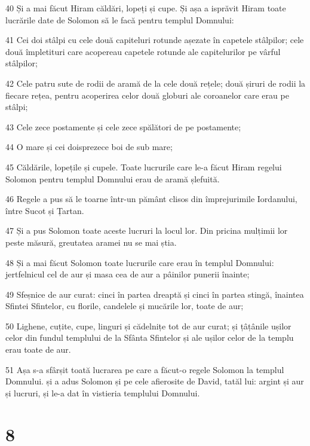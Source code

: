 \par 40 Și a mai făcut Hiram căldări, lopeți și cupe. Și așa a isprăvit Hiram toate lucrările date de Solomon să le facă pentru templul Domnului:
\par 41 Cei doi stâlpi cu cele două capiteluri rotunde așezate în capetele stâlpilor; cele două împletituri care acopereau capetele rotunde ale capitelurilor pe vârful stâlpilor;
\par 42 Cele patru sute de rodii de aramă de la cele două rețele; două șiruri de rodii la fiecare rețea, pentru acoperirea celor două globuri ale coroanelor care erau pe stâlpi;
\par 43 Cele zece postamente și cele zece spălători de pe postamente;
\par 44 O mare și cei doisprezece boi de sub mare;
\par 45 Căldările, lopețile și cupele. Toate lucrurile care le-a făcut Hiram regelui Solomon pentru templul Domnului erau de aramă șlefuită.
\par 46 Regele a pus să le toarne într-un pământ clisos din împrejurimile Iordanului, între Sucot și Țartan.
\par 47 Și a pus Solomon toate aceste lucruri la locul lor. Din pricina mulțimii lor peste măsură, greutatea aramei nu se mai știa.
\par 48 Și a mai făcut Solomon toate lucrurile care erau în templul Domnului: jertfelnicul cel de aur și masa cea de aur a pâinilor punerii înainte;
\par 49 Sfeșnice de aur curat: cinci în partea dreaptă și cinci în partea stingă, înaintea Sfintei Sfintelor, cu florile, candelele și mucările lor, toate de aur;
\par 50 Lighene, cuțite, cupe, linguri și cădelnițe tot de aur curat; și țâțânile ușilor celor din fundul templului de la Sfânta Sfintelor și ale ușilor celor de la templu erau toate de aur.
\par 51 Așa s-a sfârșit toată lucrarea pe care a făcut-o regele Solomon la templul Domnului. și a adus Solomon și pe cele afierosite de David, tatăl lui: argint și aur și lucruri, și le-a dat în vistieria templului Domnului.

\chapter{8}

